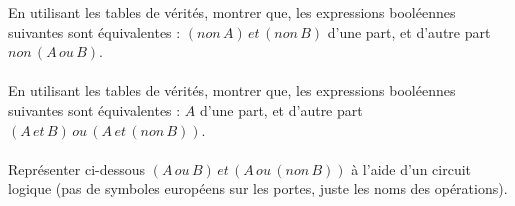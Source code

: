 \documentclass[a4paper,12pt]{article}
\begin{document}

En utilisant les tables de vérités, montrer que, les expressions booléennes suivantes sont équivalentes :
$(non\, A)\, et\, (non\, B)$ d'une part, et d'autre part $non\, (A\, ou\, B)$.\\

\\

En utilisant les tables de vérités, montrer que, les expressions booléennes suivantes sont équivalentes :
$A$ d'une part, et d'autre part $(A\,et\,B)\,ou\,(A\,et\,(non\,B))$.\\


\\

Représenter ci-dessous $(A\,ou\,B)\,et\,(A\,ou\,(non\,B))$ à l'aide d'un circuit logique (pas de symboles européens sur les portes, juste les noms des opérations).\\

\end{document}
